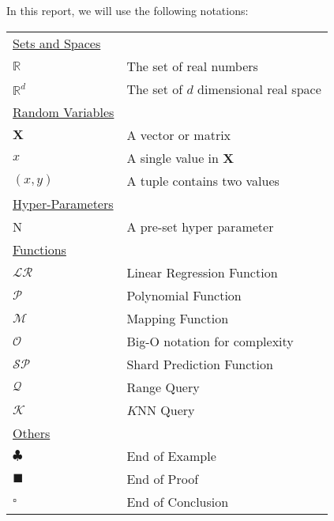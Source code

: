 In this report, we will use the following notations:

\begin{table}[h]
\begin{tabularx}{\textwidth}{@{}XX@{}}
\toprule
  \underline{Sets and Spaces} \\
  $\mathbb{R}$ & The set of real numbers \\
  $\mathbb{R}^d$ & The set of $d$ dimensional real space \\
  \underline{Random Variables} \\
  $\boldsymbol{X}$ & A vector or matrix \\
  $x$ & A single value in $\textbf{X}$ \\
  $(x,y)$ & A tuple contains two values \\	
  \underline{Hyper-Parameters} \\
  N   & A pre-set hyper parameter \\
  \underline{Functions} \\
  $\mathcal{LR}$ & Linear Regression Function\\
  $\mathcal{P}$ & Polynomial Function\\
  $\mathcal{M}$ & Mapping Function\\
  $\mathcal{O}$ & Big-O notation for complexity\\
  $\mathcal{SP}$ & Shard Prediction Function\\
  $\mathcal{Q}$ & Range Query \\
  $\mathcal{K}$ & $K$NN Query \\
  \underline{Others} \\
  $\clubsuit$ & End of Example \\
  $\blacksquare$ & End of Proof \\
  $\square$ & End of Conclusion \\
\bottomrule
\end{tabularx}
\end{table}
